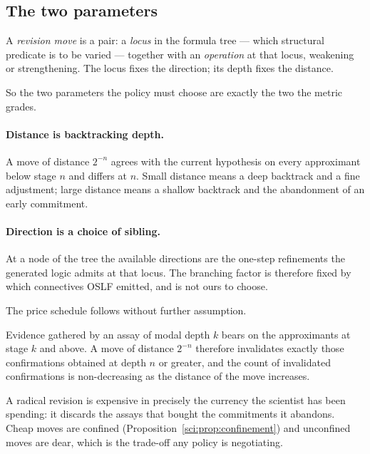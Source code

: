 \subsection{The two parameters}\label{sci:S6.2}

\begin{definition}
\label{sci:def:move}
A \emph{revision move} is a pair: a \emph{locus} in the formula tree --- which structural predicate is
to be varied --- together with an \emph{operation} at that locus, weakening or strengthening. The
locus fixes the direction; its depth fixes the distance.
\end{definition}

So the two parameters the policy must choose are exactly the two the metric grades.

\paragraph{Distance is backtracking depth.} A move of distance $2^{-n}$ agrees with the current
hypothesis on every approximant below stage $n$ and differs at $n$. Small distance means a deep
backtrack and a fine adjustment; large distance means a shallow backtrack and the abandonment of an
early commitment.

\paragraph{Direction is a choice of sibling.} At a node of the tree the available directions are the
one-step refinements the generated logic admits at that locus. The branching factor is therefore fixed
by which connectives OSLF emitted, and is not ours to choose.

The price schedule follows without further assumption.

\begin{proposition}
\label{sci:prop:movecost}
Evidence gathered by an assay of modal depth $k$ bears on the approximants at stage $k$ and above. A
move of distance $2^{-n}$ therefore invalidates exactly those confirmations obtained at depth $n$ or
greater, and the count of invalidated confirmations is non-decreasing as the distance of the move
increases.
\end{proposition}

A radical revision is expensive in precisely the currency the scientist has been spending: it discards
the assays that bought the commitments it abandons. Cheap moves are confined
(Proposition~\ref{sci:prop:confinement}) and unconfined moves are dear, which is the trade-off any policy
is negotiating.

